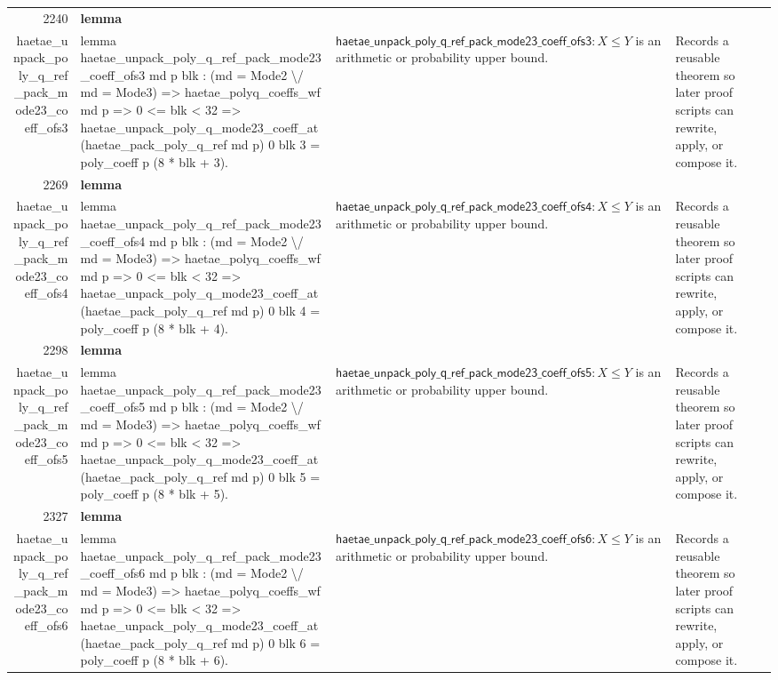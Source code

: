 \documentclass[10pt]{article}
\newcommand{\ec}[1]{\begingroup\ttfamily\scriptsize #1\endgroup}
\begin{document}
\begin{longtable}{r L{0.17\textwidth} L{0.26\textwidth} L{0.27\textwidth} L{0.20\textwidth}}
2240 & \textbf{lemma}\\\ec{haetae\_unpack\_poly\_q\_ref\_pack\_mode23\_coeff\_ofs3} & \ec{lemma haetae\_unpack\_poly\_q\_ref\_pack\_mode23\_coeff\_ofs3 md p blk : (md = Mode2 \textbackslash{}/ md = Mode3) => haetae\_polyq\_coeffs\_wf md p => 0 <= blk < 32 => haetae\_unpack\_poly\_q\_mode23\_coeff\_at (haetae\_pack\_poly\_q\_ref md p) 0 blk 3 = poly\_coeff p (8 * blk + 3).} & \(\mathsf{haetae\_unpack\_poly\_q\_ref\_pack\_mode23\_coeff\_ofs3} : X \le Y\) is an arithmetic or probability upper bound. & Records a reusable theorem so later proof scripts can rewrite, apply, or compose it. \\
2269 & \textbf{lemma}\\\ec{haetae\_unpack\_poly\_q\_ref\_pack\_mode23\_coeff\_ofs4} & \ec{lemma haetae\_unpack\_poly\_q\_ref\_pack\_mode23\_coeff\_ofs4 md p blk : (md = Mode2 \textbackslash{}/ md = Mode3) => haetae\_polyq\_coeffs\_wf md p => 0 <= blk < 32 => haetae\_unpack\_poly\_q\_mode23\_coeff\_at (haetae\_pack\_poly\_q\_ref md p) 0 blk 4 = poly\_coeff p (8 * blk + 4).} & \(\mathsf{haetae\_unpack\_poly\_q\_ref\_pack\_mode23\_coeff\_ofs4} : X \le Y\) is an arithmetic or probability upper bound. & Records a reusable theorem so later proof scripts can rewrite, apply, or compose it. \\
2298 & \textbf{lemma}\\\ec{haetae\_unpack\_poly\_q\_ref\_pack\_mode23\_coeff\_ofs5} & \ec{lemma haetae\_unpack\_poly\_q\_ref\_pack\_mode23\_coeff\_ofs5 md p blk : (md = Mode2 \textbackslash{}/ md = Mode3) => haetae\_polyq\_coeffs\_wf md p => 0 <= blk < 32 => haetae\_unpack\_poly\_q\_mode23\_coeff\_at (haetae\_pack\_poly\_q\_ref md p) 0 blk 5 = poly\_coeff p (8 * blk + 5).} & \(\mathsf{haetae\_unpack\_poly\_q\_ref\_pack\_mode23\_coeff\_ofs5} : X \le Y\) is an arithmetic or probability upper bound. & Records a reusable theorem so later proof scripts can rewrite, apply, or compose it. \\
2327 & \textbf{lemma}\\\ec{haetae\_unpack\_poly\_q\_ref\_pack\_mode23\_coeff\_ofs6} & \ec{lemma haetae\_unpack\_poly\_q\_ref\_pack\_mode23\_coeff\_ofs6 md p blk : (md = Mode2 \textbackslash{}/ md = Mode3) => haetae\_polyq\_coeffs\_wf md p => 0 <= blk < 32 => haetae\_unpack\_poly\_q\_mode23\_coeff\_at (haetae\_pack\_poly\_q\_ref md p) 0 blk 6 = poly\_coeff p (8 * blk + 6).} & \(\mathsf{haetae\_unpack\_poly\_q\_ref\_pack\_mode23\_coeff\_ofs6} : X \le Y\) is an arithmetic or probability upper bound. & Records a reusable theorem so later proof scripts can rewrite, apply, or compose it. \\

\end{longtable}
\end{document}
